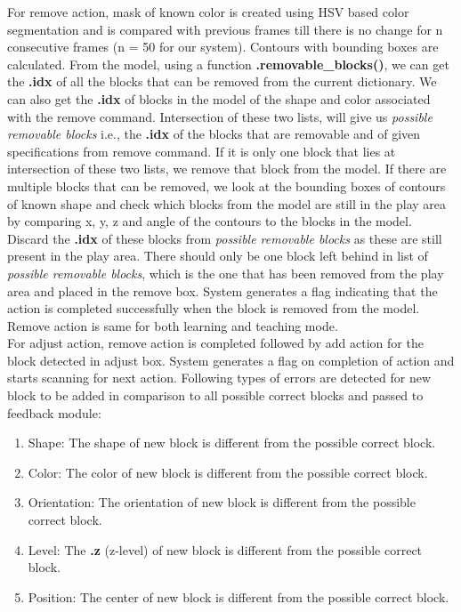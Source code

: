 For remove action, mask of known color is created using HSV based color segmentation and is compared with previous frames till there is no change for n consecutive frames (n = 50 for our system). Contours with bounding boxes are calculated. From the model, using a function \textbf{.removable\_blocks()}, we can get the \textbf{.idx} of all the blocks that can be removed from the current dictionary. We can also get the \textbf{.idx} of blocks in the model of the shape and color associated with the remove command. Intersection of these two lists, will give us \emph{possible removable blocks} i.e., the \textbf{.idx} of the blocks that are removable and of given specifications from remove command. If it is only one block that lies at intersection of these two lists, we remove that block from the model. If there are multiple blocks that can be removed, we look at the bounding boxes of contours of known shape and check which blocks from the model are still in the play area by comparing x, y, z and angle of the contours to the blocks in the model. Discard the \textbf{.idx} of these blocks from \emph{possible removable blocks} as these are still present in the play area. There should only be one block left behind in list of \emph{possible removable blocks}, which is the one that has been removed from the play area and placed in the remove box. System generates a flag indicating that the action is completed successfully when the block is removed from the model. Remove action is same for both learning and teaching mode. \\
For adjust action, remove action is completed followed by add action for the block detected in adjust box. System generates a flag on completion of action and starts scanning for next action. 
Following types of errors are detected for new block to be added in comparison to all possible correct blocks and passed to feedback module:
\begin{enumerate}
    \item Shape: The shape of new block is different from the possible correct block.
    \item Color: The color of new block is different from the possible correct block.
    \item Orientation: The orientation of new block is different from the possible correct block.
    \item Level: The \textbf{.z} (z-level) of new block is different from the possible correct block.
    \item Position: The center of new block is different from the possible correct block.
\end{enumerate}


